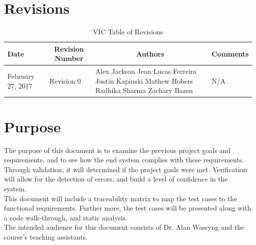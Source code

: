 \documentclass [10pt]{article}
\begin{document}
\section{Revisions}
\begin{longtable}{| p{ } | p{ } | p{ } | p{ } |} \caption{VIC Table of Revisions}  \\

\hline 
\centering \textbf{Date} & 
\multicolumn{1}{c}{\textbf {Revision Number}} &
\multicolumn{1}{|c}{\textbf {Authors}} & 
\multicolumn{1}{|c|}{\textbf {Comments}} \\ \hline

\multirow{4}{*}{\centering February 27, 2017}  & 
\multirow{4}{*}{Revision 0}& 
{Alex Jackson \newline
Jean Lucas Ferreira \newline
Justin Kapinski\newline
Mathew Hobers\newline
Radhika Sharma\newline
Zachary Bazen}
&
 \multirow{4}{*}{N/A} \\ 
\hline 


\end{longtable}
\pagebreak






\section {Purpose}
The purpose of this document is to examine the previous project goals and requirements, and to see how the end system complies with these requirements.  Through validation, it will determined if the project goals were met. Verification will allow for the detection of errors, and build a level of confidence in the system.\\

This document will include a traceability matrix to map the test cases to the functional requirements. Further more, the test cases will be presented along with a code walk-through, and static analysis.  \\


The intended audience for this document consists of Dr. Alan Wassyng and the course's teaching assistants.
\end{document}
